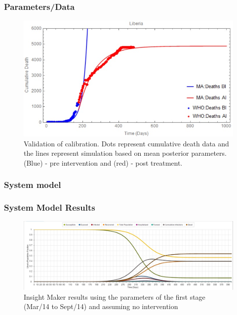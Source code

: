 \documentclass[30pt]{beamer}
\begin{document}
\begin{frame}
\frametitle{Parameters/Data}
\begin{figure}[!h]
  \centering
  \includegraphics[width=1\textwidth]{CumulativeDeathMathematica}
  \caption{Validation of calibration. Dots represent cumulative death data and the lines represent simulation
based on mean posterior parameters. (Blue) - pre intervention and (red) - post treatment.} 
\end{figure}
\end{frame}


\begin{frame}
\frametitle{System model}
\end{frame}

\begin{frame}
\frametitle{System Model Results}
\begin{figure}[!h]
  \centering
  \includegraphics[width=1\textwidth]{LB_NoInt_SD_IM}
  \caption{ Insight Maker results using the parameters of the first stage (Mar/14 to Sept/14) and assuming no intervention}
\label{fig:LB_IM_NoIn} 
\end{figure}
\end{frame}
\end{document}
